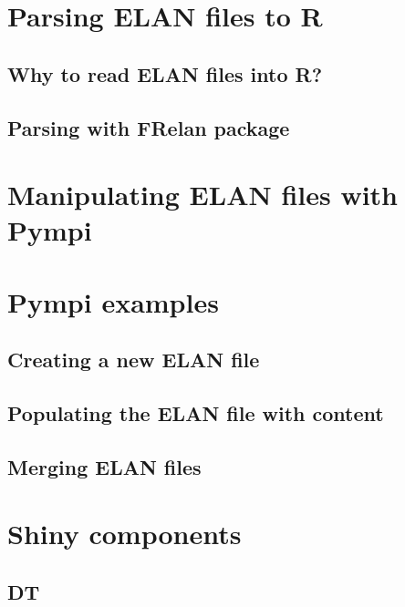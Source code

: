 \documentclass[]{book}
\theoremstyle{definition}
\theoremstyle{definition}
\theoremstyle{definition}
\theoremstyle{remark}
\begin{document}
\chapter{Parsing ELAN files to R}\label{parsing-elan-files-to-r}

\section{Why to read ELAN files into
R?}\label{why-to-read-elan-files-into-r}

\section{Parsing with FRelan package}\label{parsing-with-frelan-package}

\chapter{Manipulating ELAN files with
Pympi}\label{manipulating-elan-files-with-pympi}

\chapter{Pympi examples}\label{pympi-examples}

\section{Creating a new ELAN file}\label{creating-a-new-elan-file}

\section{Populating the ELAN file with
content}\label{populating-the-elan-file-with-content}

\section{Merging ELAN files}\label{merging-elan-files}

\chapter{Shiny components}\label{shiny-components}

\section{DT}\label{dt}
\end{document}
